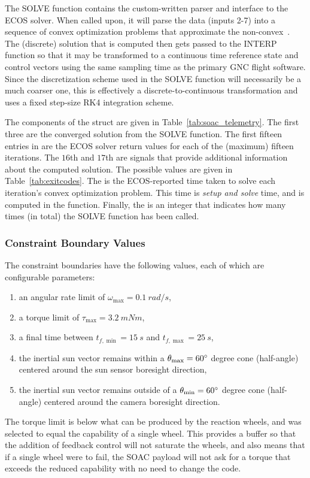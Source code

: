 \documentclass[10pt]{article}
\begin{document}
The SOLVE function contains the custom-written parser and interface to the ECOS solver. When called upon, it will parse the data (inputs 2-7) into a sequence of convex optimization problems that approximate the non-convex~. The (discrete) solution that is computed then gets passed to the INTERP function so that it may be transformed to a continuous time reference state and control vectors using the same sampling time as the primary GNC flight software. Since the discretization scheme used in the SOLVE function will necessarily be a much coarser one, this is effectively a discrete-to-continuous transformation and uses a fixed step-size RK4 integration scheme. 

The components of the  struct are given in Table~\ref{tab:soac_telemetry}. The first three are the converged solution from the SOLVE function. The first fifteen entries in  are the ECOS solver return values for each of the (maximum) fifteen iterations. The $16$th and $17$th are signals that provide additional information about the computed solution. The possible values are given in Table~\ref{tab:exitcodes}. The  is the ECOS-reported time taken to solve each iteration's convex optimization problem. This time is \textit{setup and solve} time, and is computed in the  function. Finally, the  is an integer that indicates how many times (in total) the SOLVE function has been called.

\subsubsection{Constraint Boundary Values}

The constraint boundaries have the following values, each of which are configurable parameters:
\begin{enumerate}
\item an angular rate limit of $\omega_{\max} = 0.1~\unit{rad/s}$,
\item a torque limit of $\tau_{\max} = 3.2~\unit{mNm}$,
\item a final time between $t_{f,\min}=15~\unit{s}$ and $t_{f,\max}=25~\unit{s}$,
\item the inertial sun vector remains within a $\theta_{\max}=60\mathrm{^{\circ}}$ degree cone (half-angle) centered around the sun sensor boresight direction,
\item the inertial sun vector remains outside of a $\theta_{\min}=60\mathrm{^{\circ}}$ degree cone (half-angle) centered around the camera boresight direction. 
\end{enumerate} 
The torque limit is below what can be produced by the reaction wheels, and was selected to equal the capability of a single wheel. This provides a buffer so that the addition of feedback control will not saturate the wheels, and also means that if a single wheel were to fail, the SOAC payload will not ask for a torque that exceeds the reduced capability with no need to change the code.
\end{document}
